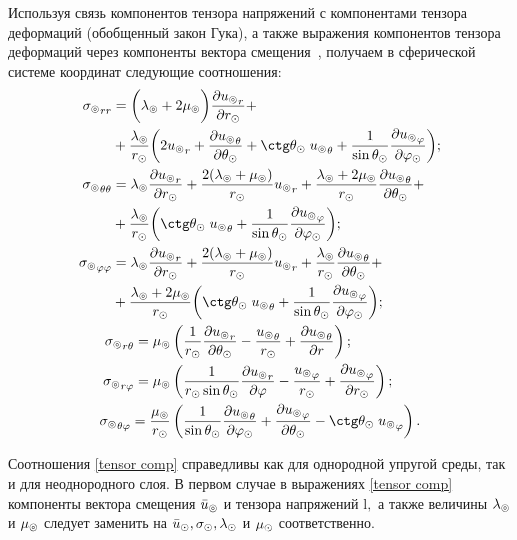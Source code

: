 Используя связь компонентов тензора напряжений с компонентами тензора деформаций (обобщенный закон Гука), а также выражения компонентов тензора деформаций через компоненты вектора смещения~\cite{Nowacki}, получаем в сферической системе координат следующие соотношения:
\begin{equation}\label{tensor comp}
    \begin{gathered}
    \begin{aligned}
        {\si\l}_{rr} &= \biggl(\la\l+2\mu\l\biggr)\fr{\de {u\l}_r}{\de r\s} +\\
        &+ \fr{\la\l} {r\s} \biggl(2{u\l}_r+\fr{\de {u\l}_\Q}{\de\Q\s}+\ctg\Q\s\;{u\l}_\Q + \fr{1}{\sin\Q\s}\fr{\de {u\l}_\f}{\de\f\s}\biggr);\\        
        {\si\l}_{\Q\Q} &= \la\l\fr{\de {u\l}_r}{\de r\s} + \fr{2(\la\l+\mu\l)}{r\s} {u\l}_r + \fr{\la\l+2\mu\l}{r\s} \fr{\de {u\l}_\Q}{\de\Q\s} +\\
         &+ \fr{\la\l}{r\s} \biggl(\ctg\Q\s \;{u\l}_\Q + \fr{1}{\sin\Q\s}\fr{\de {u\l}_\f}{\de\f\s}\biggr);\\
        {\si\l}_{\f\f} &= \la\l\fr{\de {u\l}_r}{\de r\s} + \fr{2(\la\l+\mu\l)}{r\s} {u\l}_r + \fr{\la\l}{r\s} \fr{\de {u\l}_\Q}{\de\Q\s} +\\
        &+ \fr{\la\l+2\mu\l}{r\s}\biggl(\ctg\Q\s \;{u\l}_\Q + \fr{1}{\sin\Q\s}\fr{\de {u\l}_\f}{\de\f\s}\biggr);\\
    \end{aligned}\\
    \begin{aligned}
        {\si\l}_{r\Q}=\mu\l&\left(\fr1{r\s} \fr{\de {u\l}_r}{\de\Q\s} - \fr{{u\l}_\Q}{r\s} + \fr{\de {u\l}_\Q}{\de r}\right);\\
        {\si\l}_{r\f}=\mu\l&\left(\fr1{r\s\sin\Q\s} \fr{\de {u\l}_r}{\de\f} - \fr{{u\l}_\f}{r\s} + \fr{\de {u\l}_\f}{\de r\s}\right);\\
        {\si\l}_{\Q\f}=\fr{\mu\l} {r\s}&\left(\fr1{\sin\Q\s} \fr{\de {u\l}_\Q}{\de\f\s} + \fr{\de {u\l}_\f}{\de\Q\s} - \ctg\Q\s \;{u\l}_\f \right).\\
    \end{aligned}
    \end{gathered}
\end{equation}

Соотношения \eqref{tensor comp} справедливы как для однородной упругой среды, так и для неоднородного слоя. В первом случае в выражениях \eqref{tensor comp} компоненты вектора смещения $\bar{u}_\circledcirc$ и тензора напряжений $\si\l,$ а также величины $\lambda_\circledcirc$ и $\mu_\circledcirc$ следует заменить на $\bar{u}_\odot, \sigma_\odot, \lambda_\odot$ и $\mu_\odot$ соответственно.

